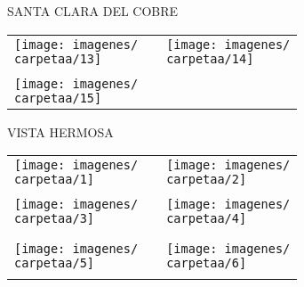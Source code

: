 \documentclass[10pt,letter]{report}
\begin{document}
\begin{center}
	\textcolor{principal}{SANTA CLARA DEL COBRE}
\end{center}
\begin{table}[H]
\centering

\footnotesize
	\begin{tabular}{m{7cm}m{1cm}m{7cm}}
	
	\texttt{[image: imagenes/\\carpetaa/13]}&&\texttt{[image: imagenes/\\carpetaa/14]}
	\\
	\\
	\texttt{[image: imagenes/\\carpetaa/15]}&&
	
	\end{tabular}
	
\end{table}
\newpage

\renewcommand{\carpetaa}{vista_hermosa}

\begin{center}
	\textcolor{principal}{VISTA HERMOSA}
\end{center}
\begin{table}[H]
\centering

\footnotesize
	\begin{tabular}{m{7cm}m{1cm}m{7cm}}
	
	\texttt{[image: imagenes/\\carpetaa/1]}&&\texttt{[image: imagenes/\\carpetaa/2]}
	\\
	\\
	\texttt{[image: imagenes/\\carpetaa/3]}&&\texttt{[image: imagenes/\\carpetaa/4]}\\
	\\
	\\
	\texttt{[image: imagenes/\\carpetaa/5]}&&\texttt{[image: imagenes/\\carpetaa/6]}
	\\
	\\
	
	\end{tabular}
	
\end{table}
\newpage
\end{document}
